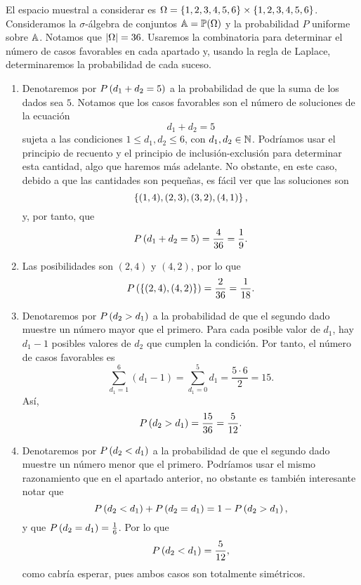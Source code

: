 \begin{solution}
  El espacio muestral a considerar es $\Omega = \left\lbrace1, 2, 3, 4, 5, 6\right\rbrace \times \left\lbrace1, 2, 3, 4, 5, 6\right\rbrace$. Consideramos la $\sigma$-álgebra de conjuntos $\mathbb{A} = \mathbb{P}(\Omega)$ y la probabilidad $P$ uniforme sobre $\mathbb{A}$. Notamos que $\left|\Omega\right| = 36$. Usaremos la combinatoria para determinar el número de casos favorables en cada apartado y, usando la regla de Laplace, determinaremos la probabilidad de cada suceso.

  \begin{enumerate}
    \item Denotaremos por $P\left(d_1 + d_2 = 5\right)$ a la probabilidad de que la suma de los dados sea $5$. Notamos que los casos favorables son el número de soluciones de la ecuación
    \[
      d_1 + d_2 = 5
    \]
    sujeta a las condiciones $1 \le d_1, d_2 \le 6$, con $d_1, d_2 \in \mathbb{N}$. Podríamos usar el principio de recuento  y el principio de inclusión-exclusión para determinar esta cantidad, algo que haremos más adelante. No obstante, en este caso, debido a que las cantidades son pequeñas, es fácil ver que las soluciones son
    \[
      \left\lbrace(1, 4), (2, 3), (3, 2), (4, 1)\right\rbrace,
    \]
    y, por tanto, que
    \[
      P\left(d_1 + d_2 = 5\right) = \frac{4}{36} = \frac{1}{9}.
    \]
    \item Las posibilidades son $(2, 4)$ y $(4, 2)$, por lo que
    \[
      P\left(\left\lbrace(2, 4), (4, 2)\right\rbrace\right) = \frac{2}{36} = \frac{1}{18}.
    \]
    \item Denotaremos por $P\left(d_2 > d_1\right)$ a la probabilidad de que el segundo dado muestre un número mayor que el primero. Para cada posible valor de $d_1$, hay $d_1 - 1$ posibles valores de $d_2$ que cumplen la condición. Por tanto, el número de casos favorables es
    \[
      \sum_{d_1 = 1}^6 (d_1 - 1) = \sum_{d_1 = 0}^5 d_1 = \frac{5 \cdot 6}{2} = 15.
    \]
    Así,
    \[
      P\left(d_2 > d_1\right) = \frac{15}{36} = \frac{5}{12}.
    \]
    \item Denotaremos por $P\left(d_2 < d_1\right)$ a la probabilidad de que el segundo dado muestre un número menor que el primero. Podríamos usar el mismo razonamiento que en el apartado anterior, no obstante es también interesante notar que
    \[
      P\left(d_2 < d_1\right) + P\left(d_2 = d_1\right) = 1 - P\left(d_2 > d_1\right),
    \]
    y que $P\left(d_2 = d_1\right) = \frac{1}{6}$. Por lo que
    \[
      P\left(d_2 < d_1\right) = \frac{5}{12},
    \]
    como cabría esperar, pues ambos casos son totalmente simétricos.
  \end{enumerate}
\end{solution}


